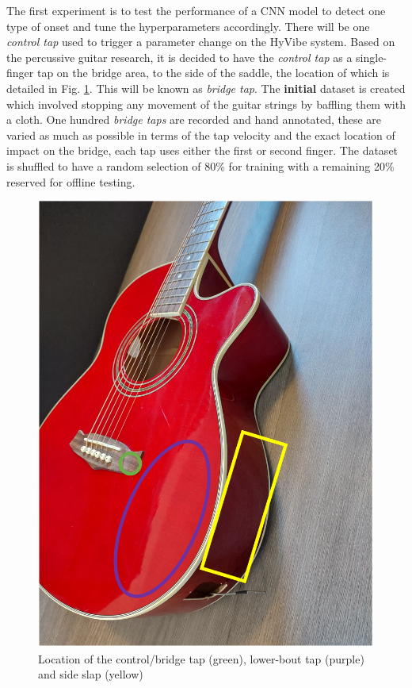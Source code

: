 \documentclass[conference]{IEEEtran}
\begin{document}
The first experiment is to test the performance of a CNN model to detect one type of onset and tune the hyperparameters accordingly. There will be one \emph{control tap} used to trigger a parameter change on the HyVibe system. Based on the percussive guitar research, it is decided to have the \emph{control tap} as a single-finger tap on the bridge area, to the side of
the saddle, the location of which is detailed in Fig. \ref{tanglewood-taps}. This will be known as \emph{bridge tap}. The \textbf{initial} dataset is created which involved stopping any movement of the guitar strings by baffling them with a cloth. One hundred \emph{bridge taps} are recorded and hand annotated, these are varied as much as possible
in terms of the tap velocity and the exact location of impact on the bridge, each tap uses either the first or second finger. The dataset is shuffled to have a random selection of 80\% for training with a remaining 20\% reserved for offline testing. 

\begin{figure}[htbp]
    \centerline{\includegraphics[scale=0.4]{tanglewood-taps.png}}
    \caption{Location of the control/bridge tap (green), lower-bout tap (purple) and side slap (yellow)}
    \label{tanglewood-taps}
    \end{figure}
\end{document}
